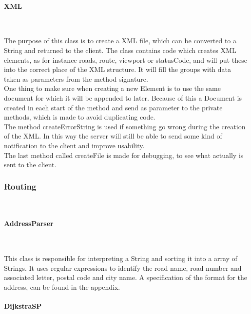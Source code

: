 \documentclass[a4paper,10pt,titlepage]{article}
\begin{document}
				
				\paragraph{XML}\mbox{}\
				
The purpose of this class is to create a XML file, which can be converted to a String and returned to the client. The class contains code which creates XML elements, as for instance roads, route, viewport or statusCode, and will put these into the correct place of the XML structure. It will fill the groups with data taken as parameters from the method signature. \\
One thing to make sure when creating a new Element is to use the same document for which it will be appended to later. Because of this a Document is created in each start of the method and send as parameter to the private methods, which is made to avoid duplicating code.\\
The method createErrorString is used if something go wrong during the creation of the XML. In this way the server will still be able to send some kind of notification to the client and improve usability.\\
The last method called createFile is made for debugging, to see what actually is sent to the client.\\


				
			\subsubsection{Routing}\
			
				\paragraph{AddressParser}\mbox{}\
				
This class is responsible for interpreting a String and sorting it into a array of Strings. It uses regular expressions to identify the road name, road number and associated letter, postal code and city name. A specification of the format for the address, can be found in the appendix.
				
				\paragraph{DijkstraSP \cite{sedgewickAndWayneDijkstraSP}}\mbox{}\
				
\end{document}
